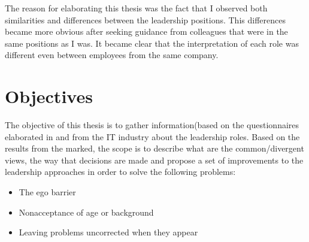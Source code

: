 The reason for elaborating this thesis was the fact that I observed both similarities and differences between the leadership positions. This differences became more obvious after seeking guidance from colleagues that were in the same positions as I was. It became clear that the interpretation of each role was different even between employees from the same company.
\section{Objectives}
\label{sec:Objectives}
The objective of this thesis is to gather information(based on the questionnaires elaborated in \cite{abur-tl} and \cite{abur-pm}  from the IT industry about the leadership roles. Based on the results from the marked, the scope is to describe what are the common/divergent views, the way that decisions are made and propose a set of improvements to the leadership approaches in order to solve the following problems:

\begin{itemize}
\item The ego barrier
\item Nonacceptance of age or background
\item Leaving problems uncorrected when they appear
\end{itemize}